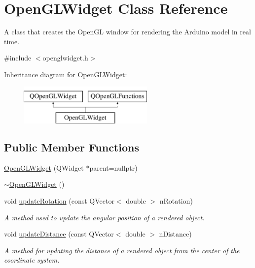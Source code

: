 \hypertarget{class_open_g_l_widget}{}\section{Open\+G\+L\+Widget Class Reference}
\label{class_open_g_l_widget}


A class that creates the Open\+GL window for rendering the Arduino model in real time.  




{\ttfamily \#include $<$openglwidget.\+h$>$}

Inheritance diagram for Open\+G\+L\+Widget\+:\begin{figure}[H]
\begin{center}
\leavevmode
\includegraphics[height=2.000000cm]{class_open_g_l_widget}
\end{center}
\end{figure}
\subsection*{Public Member Functions}
\begin{DoxyCompactItemize}
\item 
\mbox{\hyperlink{class_open_g_l_widget_a110146940a976f19017d2747c93e0390}{Open\+G\+L\+Widget}} (Q\+Widget $\ast$parent=nullptr)
\item 
\mbox{\hyperlink{class_open_g_l_widget_a293847f6a7e6c40344a1acfca3e9eb51}{$\sim$\+Open\+G\+L\+Widget}} ()
\item 
void \mbox{\hyperlink{class_open_g_l_widget_a7082dfc8237267697116a5fc03bd9a1e}{update\+Rotation}} (const Q\+Vector$<$ double $>$ n\+Rotation)
\begin{DoxyCompactList}\small\item\em A method used to update the angular position of a rendered object. \end{DoxyCompactList}\item 
void \mbox{\hyperlink{class_open_g_l_widget_a2170acd0e1f140dbf1771af9bf063c34}{update\+Distance}} (const Q\+Vector$<$ double $>$ n\+Distance)
\begin{DoxyCompactList}\small\item\em A method for updating the distance of a rendered object from the center of the coordinate system. \end{DoxyCompactList}\end{DoxyCompactItemize}
